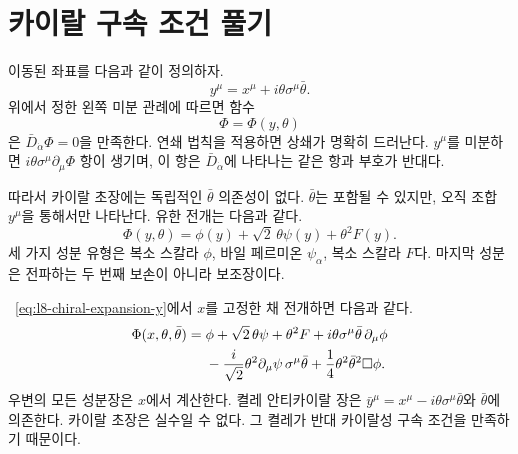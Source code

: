 \section{카이랄 구속 조건 풀기}

이동된 좌표를 다음과 같이 정의하자.
\begin{equation}
y^\mu=x^\mu+i\theta\sigma^\mu\bar\theta.
\label{eq:l8-chiral-coordinate}
\end{equation}
위에서 정한 왼쪽 미분 관례에 따르면 함수
\begin{equation}
\Phi=\Phi(y,\theta)
\label{eq:l8-chiral-solution}
\end{equation}
은 \(\bar D_{\dot\alpha}\Phi=0\)을 만족한다. 연쇄 법칙을 적용하면 상쇄가 명확히 드러난다. \(y^\mu\)를 미분하면 \(i\theta\sigma^\mu\partial_\mu\Phi\) 항이 생기며, 이 항은 \(\bar D_{\dot\alpha}\)에 나타나는 같은 항과 부호가 반대다.

따라서 카이랄 초장에는 독립적인 \(\bar\theta\) 의존성이 없다. \(\bar\theta\)는 포함될 수 있지만, 오직 조합 \(y^\mu\)을 통해서만 나타난다. 유한 전개는 다음과 같다.
\begin{equation}
\Phi(y,\theta)
=\phi(y)+\sqrt2\,\theta\psi(y)+\theta^2F(y).
\label{eq:l8-chiral-expansion-y}
\end{equation}
세 가지 성분 유형은 복소 스칼라 \(\phi\), 바일 페르미온 \(\psi_\alpha\), 복소 스칼라 \(F\)다. 마지막 성분은 전파하는 두 번째 보손이 아니라 보조장이다.

\begin{classroomqa}\end{classroomqa}

~\eqref{eq:l8-chiral-expansion-y}에서 \(x\)를 고정한 채 전개하면 다음과 같다.
\begin{align}
\Phi(x,\theta,\bar\theta)
={}&\phi
+\sqrt2\,\theta\psi
+\theta^2F
+i\theta\sigma^\mu\bar\theta\,\partial_\mu\phi
\notag\\
&-\frac{i}{\sqrt2}\theta^2
\partial_\mu\psi\,\sigma^\mu\bar\theta
+\frac14\theta^2\bar\theta^2\Box\phi.
\label{eq:l8-chiral-expansion-x}
\end{align}
우변의 모든 성분장은 \(x\)에서 계산한다. 켤레 안티카이랄 장은 \(\bar y^\mu=x^\mu-i\theta\sigma^\mu\bar\theta\)와 \(\bar\theta\)에 의존한다. 카이랄 초장은 실수일 수 없다. 그 켤레가 반대 카이랄성 구속 조건을 만족하기 때문이다.

